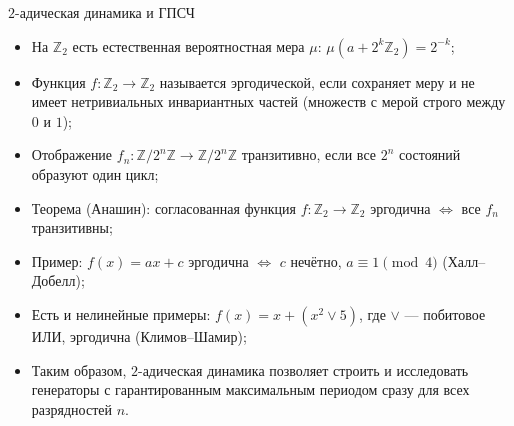 \documentclass[serif, aspectratio=169]{beamer}
\begin{document}
\begin{frame}{$2$-адическая динамика и ГПСЧ}
    \begin{itemize}
        \item На $\mathbb{Z}_2$ есть естественная вероятностная мера $\mu$: $\mu(a+2^k\mathbb{Z}_2)=2^{-k}$;
        \item Функция $f:\mathbb{Z}_2\to\mathbb{Z}_2$ называется эргодической, если сохраняет меру и не имеет нетривиальных инвариантных частей (множеств с мерой строго между $0$ и $1$);
        \item Отображение $f_n:\mathbb{Z}/2^n\mathbb{Z}\to\mathbb{Z}/2^n\mathbb{Z}$ транзитивно, если все $2^n$ состояний образуют один цикл;
        \item Теорема (Анашин): согласованная функция $f:\mathbb{Z}_2\to\mathbb{Z}_2$ эргодична $\Leftrightarrow$ все $f_n$ транзитивны;
        \item Пример: $f(x)=ax+c$ эргодична $\Leftrightarrow$ $c$ нечётно, $a\equiv1\pmod4$ (Халл--Добелл);
        \item Есть и нелинейные примеры: $f(x)=x+(x^2\vee5)$, где $\vee$ --- побитовое ИЛИ, эргодична (Климов--Шамир);
        \item Таким образом, $2$-адическая динамика позволяет строить и исследовать генераторы с гарантированным максимальным периодом сразу для всех разрядностей $n$.
    \end{itemize}

\end{frame}
\end{document}

